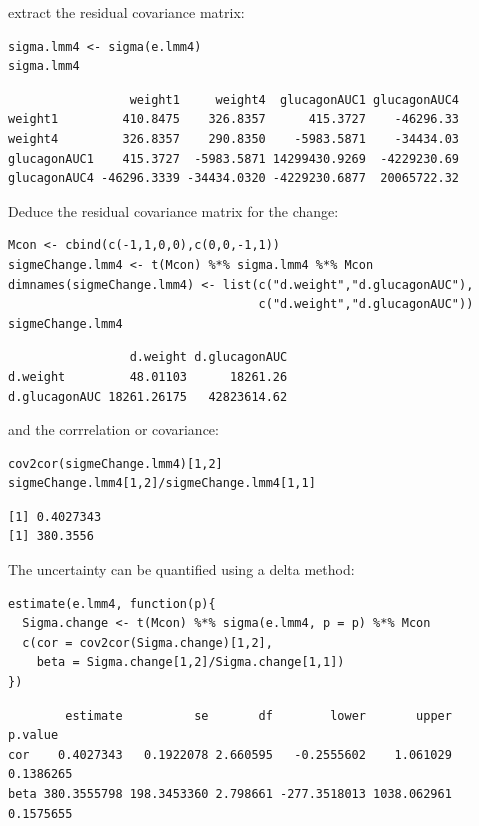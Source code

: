\documentclass[12pt]{article}
\begin{document}
extract the residual covariance matrix:
\lstset{language=r,label= ,caption= ,captionpos=b,numbers=none}
\begin{lstlisting}
sigma.lmm4 <- sigma(e.lmm4)
sigma.lmm4
\end{lstlisting}

\begin{verbatim}
                 weight1     weight4  glucagonAUC1 glucagonAUC4
weight1         410.8475    326.8357      415.3727    -46296.33
weight4         326.8357    290.8350    -5983.5871    -34434.03
glucagonAUC1    415.3727  -5983.5871 14299430.9269  -4229230.69
glucagonAUC4 -46296.3339 -34434.0320 -4229230.6877  20065722.32
\end{verbatim}


Deduce the residual covariance matrix for the change:
\lstset{language=r,label= ,caption= ,captionpos=b,numbers=none}
\begin{lstlisting}
Mcon <- cbind(c(-1,1,0,0),c(0,0,-1,1))
sigmeChange.lmm4 <- t(Mcon) %*% sigma.lmm4 %*% Mcon
dimnames(sigmeChange.lmm4) <- list(c("d.weight","d.glucagonAUC"),
                                   c("d.weight","d.glucagonAUC"))
sigmeChange.lmm4
\end{lstlisting}

\begin{verbatim}
                 d.weight d.glucagonAUC
d.weight         48.01103      18261.26
d.glucagonAUC 18261.26175   42823614.62
\end{verbatim}


and the corrrelation or covariance:
\lstset{language=r,label= ,caption= ,captionpos=b,numbers=none}
\begin{lstlisting}
cov2cor(sigmeChange.lmm4)[1,2]
sigmeChange.lmm4[1,2]/sigmeChange.lmm4[1,1]
\end{lstlisting}

\begin{verbatim}
[1] 0.4027343
[1] 380.3556
\end{verbatim}


The uncertainty can be quantified using a delta method:
\lstset{language=r,label= ,caption= ,captionpos=b,numbers=none}
\begin{lstlisting}
estimate(e.lmm4, function(p){
  Sigma.change <- t(Mcon) %*% sigma(e.lmm4, p = p) %*% Mcon
  c(cor = cov2cor(Sigma.change)[1,2],
    beta = Sigma.change[1,2]/Sigma.change[1,1])
})
\end{lstlisting}

\begin{verbatim}
        estimate          se       df        lower       upper   p.value
cor    0.4027343   0.1922078 2.660595   -0.2555602    1.061029 0.1386265
beta 380.3555798 198.3453360 2.798661 -277.3518013 1038.062961 0.1575655
\end{verbatim}
\end{document}
